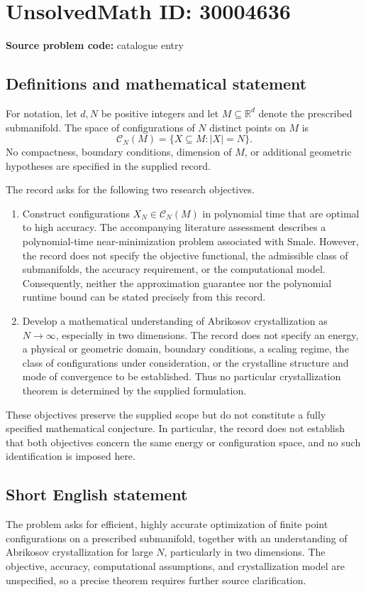 \documentclass[11pt]{article}
\newcommand{\R}{\mathbb{R}}
\begin{document}
\section*{UnsolvedMath ID: 30004636}
\textbf{Source problem code:} catalogue entry
\subsection{Definitions and mathematical statement}
For notation, let \(d,N\) be positive integers and let \(M\subseteq\R^d\) denote the prescribed submanifold. The space of configurations of \(N\) distinct points on \(M\) is
\[
\mathcal C_N(M)=\{X\subseteq M:|X|=N\}.
\]
No compactness, boundary conditions, dimension of \(M\), or additional geometric hypotheses are specified in the supplied record.

The record asks for the following two research objectives.
\begin{enumerate}
\item Construct configurations \(X_N\in\mathcal C_N(M)\) in polynomial time that are optimal to high accuracy. The accompanying literature assessment describes a polynomial-time near-minimization problem associated with Smale. However, the record does not specify the objective functional, the admissible class of submanifolds, the accuracy requirement, or the computational model. Consequently, neither the approximation guarantee nor the polynomial runtime bound can be stated precisely from this record.
\item Develop a mathematical understanding of Abrikosov crystallization as \(N\to\infty\), especially in two dimensions. The record does not specify an energy, a physical or geometric domain, boundary conditions, a scaling regime, the class of configurations under consideration, or the crystalline structure and mode of convergence to be established. Thus no particular crystallization theorem is determined by the supplied formulation.
\end{enumerate}
These objectives preserve the supplied scope but do not constitute a fully specified mathematical conjecture. In particular, the record does not establish that both objectives concern the same energy or configuration space, and no such identification is imposed here.
\subsection{Short English statement}
The problem asks for efficient, highly accurate optimization of finite point configurations on a prescribed submanifold, together with an understanding of Abrikosov crystallization for large \(N\), particularly in two dimensions. The objective, accuracy, computational assumptions, and crystallization model are unspecified, so a precise theorem requires further source clarification.
\end{document}
